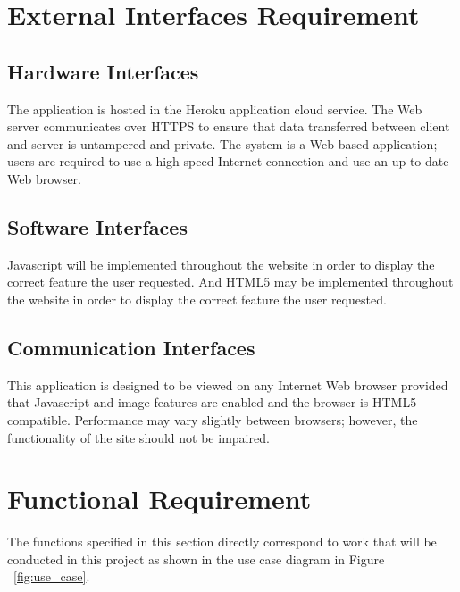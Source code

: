 
\section{External Interfaces Requirement}

\subsection{Hardware Interfaces}

The application is hosted in the Heroku application cloud service. The Web server communicates over HTTPS to ensure that data transferred between client and server is untampered and private. The system is a Web based application; users are required to use a high-speed Internet connection and use an up-to-date Web browser.

\subsection{Software Interfaces}

Javascript will be implemented throughout the website in order to display the correct feature the user requested. And HTML5 may be implemented throughout the website in order to display the correct feature the user requested.

\subsection{Communication Interfaces}

This application is designed to be viewed on any Internet Web browser provided that Javascript and image features are enabled and the browser is HTML5 compatible. Performance may vary slightly between browsers; however, the functionality of the site should not be impaired.

\section{Functional Requirement}

The functions specified in this section directly correspond to work that will be conducted in this project as shown in the use case diagram in Figure ~\ref{fig:use_case}. 

